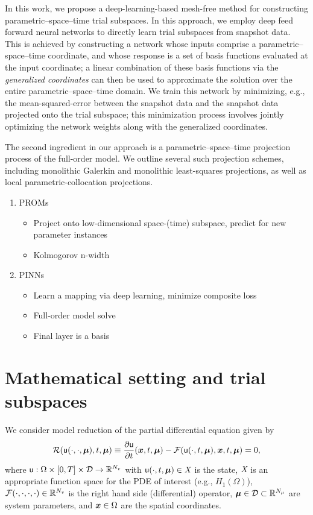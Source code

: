 \documentclass[3p,computermodern,10pt]{elsarticle}
\begin{document}
In this work, we propose a deep-learning-based mesh-free method for constructing parametric--space--time trial subspaces. In this approach, we employ deep feed forward neural networks to directly learn trial subspaces from snapshot data. This is achieved by constructing a network whose inputs comprise a parametric--space--time coordinate, and whose response is a set of basis functions evaluated at the input coordinate; a linear combination of these basis functions via the \textit{generalized coordinates} can then be used to approximate the solution over the entire parametric--space--time domain. We train this network by minimizing, e.g., the mean-squared-error between the snapshot data and the snapshot data projected onto the trial subspace; this minimization process involves jointly optimizing the network weights along with the generalized coordinates.

The second ingredient in our approach is a parametric--space--time projection process of the full-order model. We outline several such projection schemes, including monolithic Galerkin and monolithic least-squares projections, as well as local parametric-collocation projections.  
  
\begin{enumerate}
\item PROMs
\begin{itemize}
\item Project onto low-dimensional space-(time) subspace, predict for new parameter instances
\item Kolmogorov n-width
\end{itemize}
\item PINNs
\begin{itemize}
\item Learn a mapping via deep learning, minimize composite loss
\item Full-order model solve
\item Final layer is a basis
\end{itemize}
\end{enumerate}  
\section{Mathematical setting and trial subspaces}
We consider model reduction of the partial differential equation given by
\begin{equation}\label{eq:fom}
\mathcal{R}(\mathsf{u}(\cdot,\cdot,\boldsymbol \mu),t,\boldsymbol \mu) \equiv \frac{\partial \mathsf{u}}{\partial t}(\boldsymbol x, t,\boldsymbol \mu) - \mathcal{F}(\mathsf{u}(\cdot,t,\boldsymbol \mu),\boldsymbol x, t,\boldsymbol \mu) = 0, 
\end{equation}
where $\mathsf{u}: \Omega \times [0,T] \times \mathcal{D} \rightarrow \mathbb{R}^{N_v}$ with $\mathsf{u}(\cdot,t,\boldsymbol \mu) \in \textit{X}$ is the state, $\textit{X}$ is an appropriate function space for the PDE of interest (e.g., $H_1(\Omega)$), $\mathcal{F}(\cdot,\cdot,\cdot,\cdot) \in \mathbb{R}^{N_v}$ is the right hand side (differential) operator, $\boldsymbol \mu \in \mathcal{D} \subset \mathbb{R}^{N_{\mu}}$  are system parameters, and $\boldsymbol x \in \Omega$ are the spatial coordinates.
\end{document}
